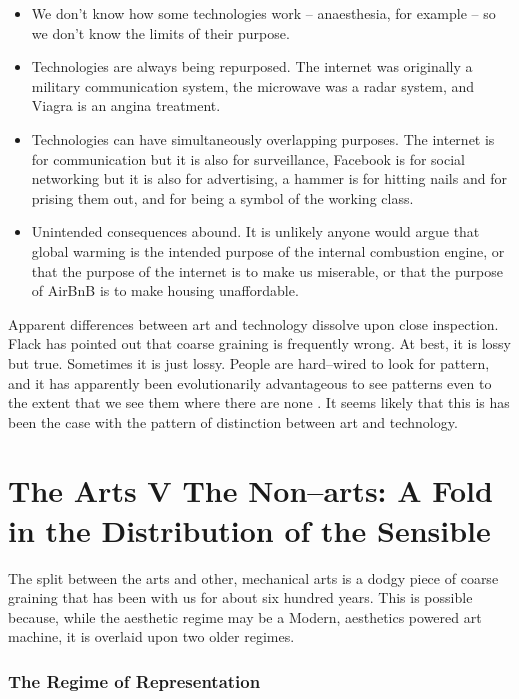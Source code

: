 \documentclass[letterpaper]{article}
\begin{document}
    \begin{itemize}
     
        \item We don't know how some technologies work – anaesthesia, for example – so we don't know the limits of their purpose.
    
        \item Technologies are always being repurposed. The internet was originally a military communication system, the microwave was a radar system, and Viagra is an angina treatment.

        \item Technologies can have simultaneously overlapping purposes. The internet is for communication but it is also for surveillance, Facebook is for social networking but it is also for advertising, a hammer is for hitting nails and for prising them out, and for being a symbol of the working class.

        \item Unintended consequences abound. It is unlikely anyone would argue that global warming is the intended purpose of the internal combustion engine, or that the purpose of the internet is to make us miserable, or that the purpose of AirBnB is to make housing unaffordable.
    \end{itemize}

    Apparent differences between art and technology dissolve upon close inspection. Flack has pointed out that coarse graining is frequently wrong. At best, it is lossy but true. Sometimes it is just lossy. People are hard–wired to look for pattern, and it has apparently been evolutionarily advantageous to see patterns even to the extent that we see them where there are none \citep{FristonThFrEnrgPrncpl2010}. It seems likely that this is has been the case with the pattern of distinction between art and technology.

\section{The Arts V The Non–arts: A Fold in the Distribution of the Sensible}
    
    The split between the arts and other, mechanical arts is a dodgy piece of coarse graining that has been with us for about six hundred years. This is possible because, while the aesthetic regime may be a Modern, aesthetics powered art machine, it is overlaid upon two older regimes. 
    
    \subsubsection{The Regime of Representation}
\end{document}
